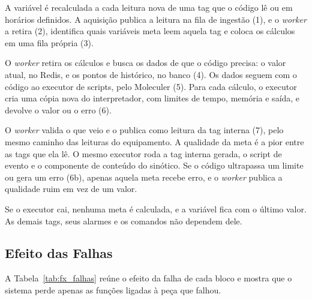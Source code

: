 \par A variável é recalculada a cada leitura nova de uma tag que o código lê ou em horários definidos. A aquisição publica a leitura na fila de ingestão (1), e o \emph{worker} a retira (2), identifica quais variáveis meta leem aquela tag e coloca os cálculos em uma fila própria (3).

\par O \emph{worker} retira os cálculos e busca os dados de que o código precisa: o valor atual, no Redis, e os pontos de histórico, no banco (4). Os dados seguem com o código ao executor de scripts, pelo Moleculer (5). Para cada cálculo, o executor cria uma cópia nova do interpretador, com limites de tempo, memória e saída, e devolve o valor ou o erro (6).

\par O \emph{worker} valida o que veio e o publica como leitura da tag interna (7), pelo mesmo caminho das leituras do equipamento. A qualidade da meta é a pior entre as tags que ela lê. O mesmo executor roda a tag interna gerada, o script de evento e o componente de conteúdo do sinótico. Se o código ultrapassa um limite ou gera um erro (6b), apenas aquela meta recebe erro, e o \emph{worker} publica a qualidade ruim em vez de um valor.

\par Se o executor cai, nenhuma meta é calculada, e a variável fica com o último valor. As demais tags, seus alarmes e os comandos não dependem dele.

\subsection{Efeito das Falhas}

\par A Tabela~\ref{tab:fx_falhas} reúne o efeito da falha de cada bloco e mostra que o sistema perde apenas as funções ligadas à peça que falhou.

